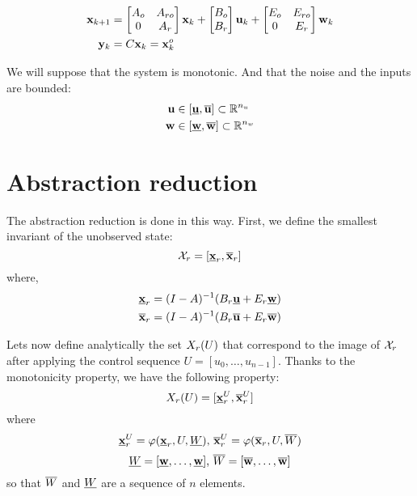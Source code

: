 \documentclass{article}
\theoremstyle{named}
\begin{document}
\begin{equation}
\begin{aligned}
 \mathbf{x}_{k+1} &=
\begin{bmatrix} A_o&A_{ro}\\ 0& A_r \end{bmatrix}  \mathbf{x}_k + 
\begin{bmatrix} B_o\\ B_r \end{bmatrix}  \mathbf{u}_k + 
\begin{bmatrix} E_o & E_{ro} \\ 0 & E_r \end{bmatrix}  \mathbf{w}_k
\\
 \mathbf{y}_k &= C \mathbf{x}_k =  \mathbf{x}^o_k
\end{aligned}
\end{equation}

We will suppose that the system is monotonic. 
And that the noise and the inputs are bounded:
\begin{equation}
\begin{aligned}
 \mathbf{u} &\in [\underline{ \mathbf{u}},\overline{ \mathbf{u}}] \subset \mathbb{R}^{n_u}\\
 \mathbf{w} &\in [\underline{ \mathbf{w}},\overline{ \mathbf{w}}] \subset \mathbb{R}^{n_w}\\
\end{aligned}
\end{equation}

\section{Abstraction reduction}

The abstraction reduction is done in this way. First, we define the smallest invariant of the unobserved state:
$$
\mathcal{X}_r = [\underline{ \mathbf{x}}_r,\overline{ \mathbf{x}}_r]
$$
where,
$$
\begin{aligned}
\underline{ \mathbf{x}}_r &= (I-A)^{-1} (B_r \underline{ \mathbf{u}} + E_r \underline{ \mathbf{w}})\\
\overline{ \mathbf{x}}_r &= (I-A)^{-1} (B_r \overline{ \mathbf{u}} + E_r \overline{ \mathbf{w}})
\end{aligned}
$$

Lets now define analytically the set $X_r(U)$ that correspond to the image of $\mathcal{X}_r$ after applying the control sequence $U = [u_0,\dots,u_{n-1}]$.
Thanks to the monotonicity property, we have the following property:
\newcommand{\xui}{\minf{\x}^U_r}
\newcommand{\xus}{\msup{\x}^U_r}
\newcommand{\xu}{\x^U_r}
$$\Xr(U) = [\xui,\xus]$$
where
$$\xui = \traj (\xrinf,U,\Winf)
\textrm{, }
\xus = \traj (\xrsup,U,\Wsup)$$
$$ \underline{W} = [\underline{ \mathbf{w}},\dots,\underline{ \mathbf{w}}]
\textrm{, }
\overline{W} = [\overline{ \mathbf{w}},\dots,\overline{ \mathbf{w}}]$$
so that $\overline{W}$ and $\underline{W}$ are a sequence of $n$ elements.
\end{document}
